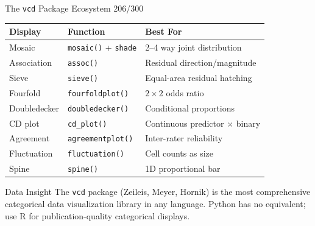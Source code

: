 \documentclass[10pt]{beamer}
\newcommand{\smark}[1]{\hfill{\scriptsize\color{codegray}#1}}
\begin{document}
\begin{frame}{The \texttt{vcd} Package Ecosystem}
\smark{206/300}
\centering\small
\begin{tabular}{@{}lll@{}}
    \toprule
    \textbf{Display} & \textbf{Function} & \textbf{Best For} \\
    \midrule
    Mosaic              & \texttt{mosaic()} + \texttt{shade}   & 2--4 way joint distribution \\
    Association         & \texttt{assoc()}                      & Residual direction/magnitude \\
    Sieve               & \texttt{sieve()}                      & Equal-area residual hatching \\
    Fourfold            & \texttt{fourfoldplot()}               & $2 \times 2$ odds ratio \\
    Doubledecker        & \texttt{doubledecker()}               & Conditional proportions \\
    CD plot             & \texttt{cd\_plot()}                   & Continuous predictor $\times$ binary \\
    Agreement           & \texttt{agreementplot()}              & Inter-rater reliability \\
    Fluctuation         & \texttt{fluctuation()}                & Cell counts as size \\
    Spine               & \texttt{spine()}                      & 1D proportional bar \\
    \bottomrule
\end{tabular}

\vspace{0.3cm}
\begin{exampleblock}{Data Insight}
    \scriptsize The \texttt{vcd} package (Zeileis, Meyer, Hornik) is the most comprehensive categorical data visualization library in any language. Python has no equivalent; use R for publication-quality categorical displays.
\end{exampleblock}
\end{frame}
\end{document}
